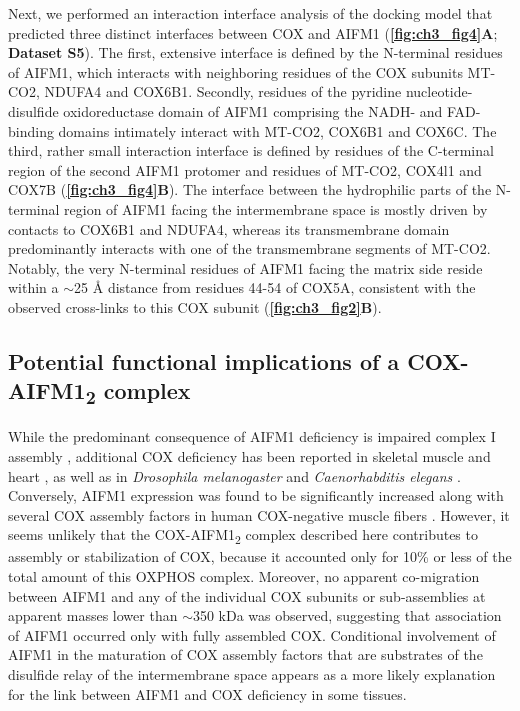 Next, we performed an interaction interface analysis of the docking model that predicted three distinct interfaces between COX and AIFM1 (\textbf{\autoref{fig:ch3_fig4}A}; \textbf{Dataset S5}). The first, extensive interface is defined by the N-terminal residues of AIFM1, which interacts with neighboring residues of the COX subunits MT-CO2, NDUFA4 and COX6B1. Secondly, residues of the pyridine nucleotide-disulfide oxidoreductase domain of AIFM1 comprising the NADH- and FAD-binding domains intimately interact with MT-CO2, COX6B1 and COX6C. The third, rather small interaction interface is defined by residues of the C-terminal region of the second AIFM1 protomer and residues of MT-CO2, COX4l1 and COX7B (\textbf{\autoref{fig:ch3_fig4}B}). The interface between the hydrophilic parts of the N-terminal region of AIFM1 facing the intermembrane space is mostly driven by contacts to COX6B1 and NDUFA4, whereas its transmembrane domain predominantly interacts with one of the transmembrane segments of MT-CO2. Notably, the very N-terminal residues of AIFM1 facing the matrix side reside within a $\sim$25 Å distance from residues 44-54 of COX5A, consistent with the observed cross-links to this COX subunit (\textbf{\autoref{fig:ch3_fig2}B}).
%
\subsection*{Potential functional implications of a COX-AIFM1\textsubscript{2} complex}
While the predominant consequence of AIFM1 deficiency is impaired complex I assembly \cite{RN4}, additional COX deficiency has been reported in skeletal muscle and heart \cite{RN10, RN9}, as well as in \emph{Drosophila melanogaster} \cite{RN48} and \emph{Caenorhabditis elegans} \cite{RN49}. Conversely, AIFM1 expression was found to be significantly increased along with several COX assembly factors in human COX-negative muscle fibers \cite{RN50}. However, it seems unlikely that the COX-AIFM1\textsubscript{2} complex described here contributes to assembly or stabilization of COX, because it accounted only for 10\% or less of the total amount of this OXPHOS complex. Moreover, no apparent co-migration between AIFM1 and any of the individual COX subunits or sub-assemblies at apparent masses lower than $\sim$350 kDa was observed, suggesting that association of AIFM1 occurred only with fully assembled COX. Conditional involvement of AIFM1 in the maturation of COX assembly factors that are substrates of the disulfide relay of the intermembrane space \cite{RN8, RN7, RN6} appears as a more likely explanation for the link between AIFM1 and COX deficiency in some tissues.

